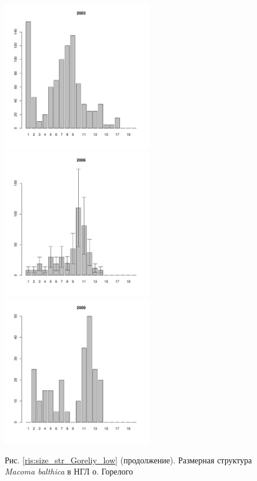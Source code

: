 \documentclass[12pt, a4paper]{article}
\begin{document}
\begin{figure}[h]
\begin{multicols}{3}
\hfill
\includegraphics[width=65mm]{../White_Sea/Luvenga_Goreliy/low_2003_.pdf}
\hfill
\includegraphics[width=65mm]{../White_Sea/Luvenga_Goreliy/low_2006_.pdf}
\hfill
\includegraphics[width=65mm]{../White_Sea/Luvenga_Goreliy/low_2009_.pdf}
\end{multicols}



\begin{center}
Рис. \ref{ris:size_str_Goreliy_low} (продолжение). Размерная структура {\it Macoma balthica} в НГЛ о. Горелого

\end{center}
\end{figure}
\end{document}
